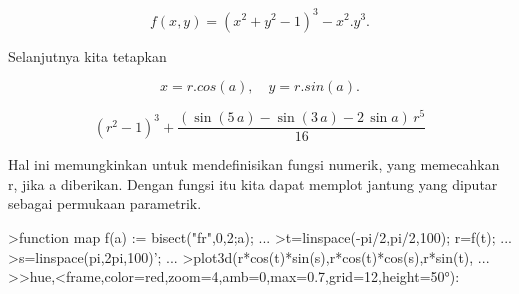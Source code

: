 \documentclass[a4paper,10pt]{article}
\begin{document}
\begin{eulernotebook}
\begin{eulercomment}
\begin{eulercomment}
\begin{eulercomment}
\begin{eulercomment}
\begin{eulercomment}
\begin{eulercomment}
\begin{eulercomment}
\begin{eulercomment}
\begin{eulercomment}
\begin{eulercomment}
\begin{eulercomment}
\begin{eulercomment}
\begin{eulercomment}
\begin{eulercomment}
\begin{eulercomment}
\begin{eulercomment}
\begin{eulercomment}
\begin{eulercomment}
\begin{eulercomment}
\begin{eulercomment}
\begin{eulercomment}
\begin{eulercomment}
\begin{eulercomment}
\begin{eulercomment}
\begin{eulercomment}
\begin{eulercomment}
\begin{eulercomment}
\begin{eulercomment}
\begin{eulercomment}
\begin{eulercomment}
\begin{eulercomment}
\begin{eulercomment}
\begin{eulercomment}
\begin{eulercomment}
\begin{eulercomment}
\begin{eulercomment}
\begin{eulercomment}
\begin{eulercomment}
\begin{eulercomment}
\begin{eulercomment}
\begin{eulercomment}
\end{eulercomment}
\begin{eulerformula}
\[
f(x,y)=(x^2+y^2-1)^3-x^2.y^3.
\]
\end{eulerformula}
\begin{eulercomment}
Selanjutnya kita tetapkan

\end{eulercomment}
\begin{eulerformula}
\[
x=r.cos(a),\quad y=r.sin(a).
\]
\end{eulerformula}
\begin{eulerformula}
\[
\left(r^2-1\right)^3+\frac{\left(\sin \left(5\,a\right)-\sin \left(
 3\,a\right)-2\,\sin a\right)\,r^5}{16}
\]
\end{eulerformula}
\begin{eulercomment}
Hal ini memungkinkan untuk mendefinisikan fungsi numerik, yang
memecahkan r, jika a diberikan. Dengan fungsi itu kita dapat memplot
jantung yang diputar sebagai permukaan parametrik.
\end{eulercomment}
\begin{eulerprompt}
>function map f(a) := bisect("fr",0,2;a); ...
>t=linspace(-pi/2,pi/2,100); r=f(t);  ...
>s=linspace(pi,2pi,100)'; ...
>plot3d(r*cos(t)*sin(s),r*cos(t)*cos(s),r*sin(t), ...
>>hue,<frame,color=red,zoom=4,amb=0,max=0.7,grid=12,height=50°):
\end{eulerprompt}

\end{eulercomment}
\end{eulercomment}
\end{eulercomment}
\end{eulercomment}
\end{eulercomment}
\end{eulercomment}
\end{eulercomment}
\end{eulercomment}
\end{eulercomment}
\end{eulercomment}
\end{eulercomment}
\end{eulercomment}
\end{eulercomment}
\end{eulercomment}
\end{eulercomment}
\end{eulercomment}
\end{eulercomment}
\end{eulercomment}
\end{eulercomment}
\end{eulercomment}
\end{eulercomment}
\end{eulercomment}
\end{eulercomment}
\end{eulercomment}
\end{eulercomment}
\end{eulercomment}
\end{eulercomment}
\end{eulercomment}
\end{eulercomment}
\end{eulercomment}
\end{eulercomment}
\end{eulercomment}
\end{eulercomment}
\end{eulercomment}
\end{eulercomment}
\end{eulercomment}
\end{eulercomment}
\end{eulercomment}
\end{eulercomment}
\end{eulercomment}
\end{eulernotebook}
\end{document}
